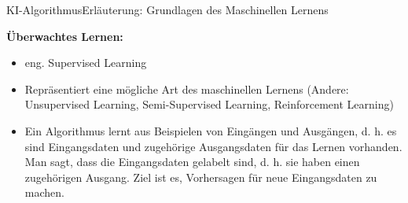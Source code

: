 \documentclass[169, handout	]{THIbeamer} %
\begin{document}
	\begin{frame}{KI-Algorithmus}{Erläuterung: Grundlagen des Maschinellen Lernens}
		
		\textbf{Überwachtes Lernen:}		
		\begin{itemize}
			\item eng. Supervised Learning
			\item Repräsentiert eine mögliche Art des maschinellen Lernens (Andere: Unsupervised Learning, Semi-Supervised Learning, Reinforcement Learning)
			\item Ein Algorithmus lernt aus Beispielen von Eingängen und Ausgängen, d. h. es sind Eingangsdaten und zugehörige Ausgangsdaten
für das Lernen vorhanden. Man sagt, dass die Eingangsdaten gelabelt sind, d. h. sie haben
einen zugehörigen Ausgang. Ziel ist es, Vorhersagen für neue Eingangsdaten zu machen.
		\end{itemize}
	\end{frame}
\end{document}
